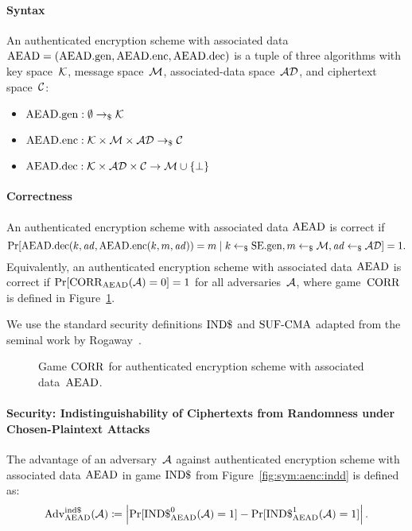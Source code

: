 \documentclass[a4paper,orivec]{llncs}
\begin{document}
\paragraph{Syntax}
An authenticated encryption scheme with associated data $\mathrm{AEAD}=(\mathrm{AEAD}.\mathrm{gen},\mathrm{AEAD}.\mathrm{enc},\mathrm{AEAD}.\mathrm{dec})$ is a tuple of three algorithms with key space~$\mathcal{K}$, message space~$\mathcal{M}$, associated-data space~$\mathcal{AD}$, and ciphertext space~$\mathcal{C}$:

\begin{itemize}
    \item $\mathrm{AEAD}.\mathrm{gen}: \emptyset \to_\$ \mathcal{K}$
    \item $\mathrm{AEAD}.\mathrm{enc}: \mathcal{K}\times\mathcal{M}\times\mathcal{AD} \to_\$ \mathcal{C}$
    \item $\mathrm{AEAD}.\mathrm{dec}: \mathcal{K}\times\mathcal{AD}\times\mathcal{C} \to \mathcal{M}\cup\{\bot\}$
\end{itemize}

\paragraph{Correctness}
An authenticated encryption scheme with associated data $\mathrm{AEAD}$ is correct if 
\[
\Pr[\mathrm{AEAD}.\mathrm{dec}(k,\mathit{ad},\mathrm{AEAD}.\mathrm{enc}(k,m,\mathit{ad}))=m\mid k\gets_\$\mathrm{SE}.\mathrm{gen},m\gets_\$\mathcal{M},\mathit{ad}\gets_\$\mathcal{AD}]=1\text{.}
\]
Equivalently, an authenticated encryption scheme with associated data $\mathrm{AEAD}$ is correct if $\Pr[\mathrm{CORR}_{\mathrm{AEAD}}(\mathcal{A})=0]=1$ for all adversaries~$\mathcal{A}$, where game~$\mathrm{CORR}$ is defined in Figure~\ref{fig:sym:aenc:corr}.

We use the standard security definitions ${\mathrm{IND}\$}$ and ${\mathrm{SUF}\text{-}\mathrm{CMA}}$ adapted from the seminal work by Rogaway~\cite{CCS:Rogaway02}.

\begin{figure}[!ht]
    \centering
    \nicoresetlinenr%
    \fbox{%
        \scalebox{\codescalefactor}{%
        }%
    }
    \caption{%
        Game $\mathrm{CORR}$ for authenticated encryption scheme with associated data~$\mathrm{AEAD}$.
    }
    \label{fig:sym:aenc:corr}
\end{figure}

\paragraph{Security: Indistinguishability of Ciphertexts from Randomness under Chosen-Plaintext Attacks}
The advantage of an adversary~$\mathcal{A}$ against authenticated encryption scheme with associated data $\mathrm{AEAD}$ in game ${\mathrm{IND}\$}$ from Figure~\ref{fig:sym:aenc:indd} is defined as:
\[
\mathrm{Adv}_{\mathrm{AEAD}}^{\mathrm{ind}\$}(\mathcal{A})\coloneqq\left|\Pr[{\mathrm{IND}\$}_{\mathrm{AEAD}}^0(\mathcal{A})=1]-\Pr[{\mathrm{IND}\$}_{\mathrm{AEAD}}^1(\mathcal{A})=1]\right|\text{.}
\]
\end{document}

